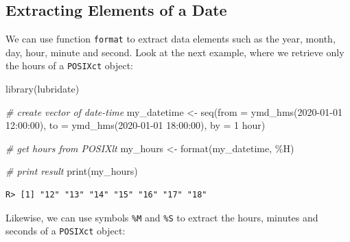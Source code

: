 \documentclass[
  12pt,
]{book}
\newenvironment{Shaded}{\begin{snugshade}}{\end{snugshade}}
\newcommand{\AttributeTok}[1]{\textcolor[rgb]{0.61,0.61,0.61}{#1}}
\newcommand{\CommentTok}[1]{\textcolor[rgb]{0.37,0.37,0.37}{\textit{#1}}}
\newcommand{\FunctionTok}[1]{\textcolor[rgb]{0,0,0}{#1}}
\newcommand{\NormalTok}[1]{#1}
\newcommand{\OtherTok}[1]{\textcolor[rgb]{0.37,0.37,0.37}{#1}}
\newcommand{\StringTok}[1]{\textcolor[rgb]{0.5,0.5,0.5}{#1}}
\begin{document}
\hypertarget{extracting-elements-of-a-date}{%
\subsection{Extracting Elements of a Date}\label{extracting-elements-of-a-date}}

We can use function \texttt{format} to extract data elements such as the year, month, day, hour, minute and second. Look at the next example, where we retrieve only the hours of a \texttt{POSIXct} object: 

\begin{Shaded}
\begin{Highlighting}[]
\FunctionTok{library}\NormalTok{(lubridate)}

\CommentTok{\# create vector of date{-}time}
\NormalTok{my\_datetime }\OtherTok{\textless{}{-}} \FunctionTok{seq}\NormalTok{(}\AttributeTok{from =} \FunctionTok{ymd\_hms}\NormalTok{(}\StringTok{\textquotesingle{}2020{-}01{-}01 12:00:00\textquotesingle{}}\NormalTok{),}
                   \AttributeTok{to =} \FunctionTok{ymd\_hms}\NormalTok{(}\StringTok{\textquotesingle{}2020{-}01{-}01 18:00:00\textquotesingle{}}\NormalTok{),}
                   \AttributeTok{by =} \StringTok{\textquotesingle{}1 hour\textquotesingle{}}\NormalTok{)}

\CommentTok{\# get hours from POSIXlt}
\NormalTok{my\_hours }\OtherTok{\textless{}{-}} \FunctionTok{format}\NormalTok{(my\_datetime, }\StringTok{\textquotesingle{}\%H\textquotesingle{}}\NormalTok{)}

\CommentTok{\# print result}
\FunctionTok{print}\NormalTok{(my\_hours)}
\end{Highlighting}
\end{Shaded}

\begin{verbatim}
R> [1] "12" "13" "14" "15" "16" "17" "18"
\end{verbatim}

Likewise, we can use symbols \texttt{\%M} and \texttt{\%S} to extract the hours, minutes and seconds of a \texttt{POSIXct} object:
\end{document}

